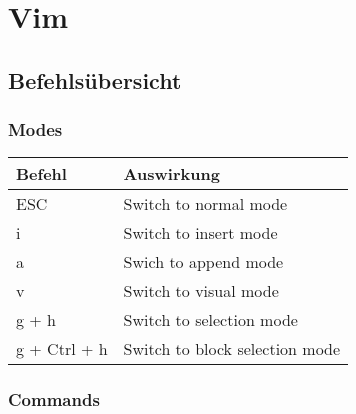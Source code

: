 \section{Vim}

   \subsection{Befehlsübersicht}
   
      \subsubsection{Modes}
          \renewcommand{\arraystretch}{1.5}
            
            \begin{longtable}{|p{7cm}|p{8cm}|}
               
               \hline

               \rowcolor{tableheadcolor}
               
               \textbf{Befehl} & \textbf{Auswirkung}

               \\ \hline

               ESC & Switch to normal mode
               
               \\ \hline

               i & Switch to insert mode

               \\ \hline

               a & Swich to append mode

               \\ \hline

               v & Switch to visual mode
         
               \\ \hline

               g + h & Switch to selection mode

               \\ \hline

               g + Ctrl + h & Switch to block selection mode

               \\ \hline

            \end{longtable}

      \subsubsection{Commands}
           \renewcommand{\arraystretch}{1.5}
            

